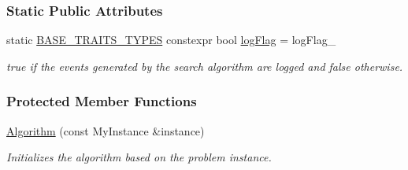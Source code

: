 \subsubsection*{Static Public Attributes}
\begin{DoxyCompactItemize}
\item 
static \hyperlink{algorithm_8h_af9ce42dc0033d5c93cea8af7002ab583}{B\+A\+S\+E\+\_\+\+T\+R\+A\+I\+T\+S\+\_\+\+T\+Y\+P\+ES} constexpr bool \hyperlink{structslb_1_1ext_1_1algorithm_1_1Algorithm_a614bd0faf9d0eba04f45bb204afac021}{log\+Flag} = log\+Flag\+\_\+\hypertarget{structslb_1_1ext_1_1algorithm_1_1Algorithm_a614bd0faf9d0eba04f45bb204afac021}{}\label{structslb_1_1ext_1_1algorithm_1_1Algorithm_a614bd0faf9d0eba04f45bb204afac021}

\begin{DoxyCompactList}\small\item\em {\ttfamily true} if the events generated by the search algorithm are logged and {\ttfamily false} otherwise. \end{DoxyCompactList}\end{DoxyCompactItemize}
\subsubsection*{Protected Member Functions}
\begin{DoxyCompactItemize}
\item 
\hyperlink{structslb_1_1ext_1_1algorithm_1_1Algorithm_a1569912641a50ba140907372462177cf}{Algorithm} (const My\+Instance \&instance)
\begin{DoxyCompactList}\small\item\em Initializes the algorithm based on the problem instance. \end{DoxyCompactList}\end{DoxyCompactItemize}
